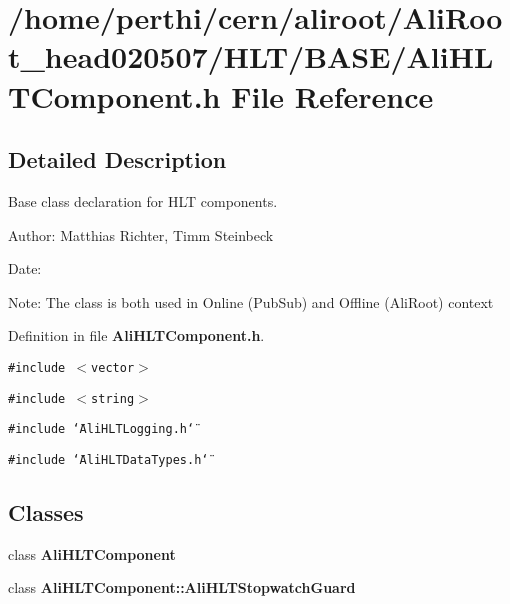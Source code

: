 \section{/home/perthi/cern/aliroot/Ali\-Root\_\-head020507/HLT/BASE/Ali\-HLTComponent.h File Reference}
\label{AliHLTComponent_8h}


\subsection{Detailed Description}
Base class declaration for HLT components. 

\begin{Desc}
\item[Author:]Matthias Richter, Timm Steinbeck \end{Desc}
\begin{Desc}
\item[Date:]\end{Desc}
\begin{Desc}
\item[Note:]The class is both used in Online (Pub\-Sub) and Offline (Ali\-Root) context\end{Desc}


Definition in file {\bf Ali\-HLTComponent.h}.

{\tt \#include $<$vector$>$}\par
{\tt \#include $<$string$>$}\par
{\tt \#include \char`\"{}Ali\-HLTLogging.h\char`\"{}}\par
{\tt \#include \char`\"{}Ali\-HLTData\-Types.h\char`\"{}}\par
\subsection*{Classes}
\begin{CompactItemize}
\item 
class {\bf Ali\-HLTComponent}
\item 
class {\bf Ali\-HLTComponent::Ali\-HLTStopwatch\-Guard}
\end{CompactItemize}

